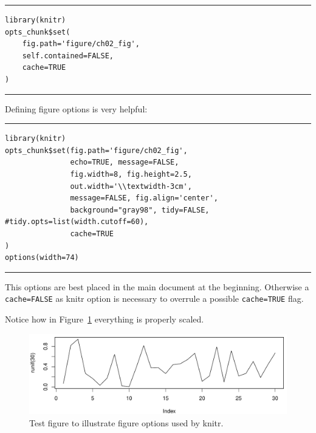 \bigskip

\hrule
\begin{knitrout}
\color{fgcolor}\begin{kframe}
\begin{verbatim}
library(knitr) 
opts_chunk$set( 
    fig.path='figure/ch02_fig',    
    self.contained=FALSE,
    cache=TRUE
) 
\end{verbatim}
\end{kframe}
\end{knitrout}
\hrule

\bigskip

Defining figure options is very helpful:

 
\bigskip


\hrule
\begin{knitrout}
\color{fgcolor}\begin{kframe}
\begin{verbatim}
library(knitr)
opts_chunk$set(fig.path='figure/ch02_fig',
               echo=TRUE, message=FALSE,
               fig.width=8, fig.height=2.5,  
               out.width='\\textwidth-3cm',
               message=FALSE, fig.align='center',
               background="gray98", tidy=FALSE, #tidy.opts=list(width.cutoff=60),
               cache=TRUE
) 
options(width=74)
\end{verbatim}
\end{kframe}
\end{knitrout}
\hrule

\bigskip 

This options are best placed in the main document at the beginning. Otherwise a \verb+cache=FALSE+ as knitr option is necessary to overrule a possible  \verb+cache=TRUE+ flag. 

\bigskip 

Notice how in Figure~\ref{f02:1} everything is properly scaled.   

\begin{figure}
\begin{knitrout}
\color{fgcolor}

{\centering \includegraphics[width=\textwidth-3cm]{figure/ch02_figunnamed-chunk-3-1} 

}


\end{knitrout}
  \caption{Test figure to illustrate figure options used by knitr.}
  \label{f02:1}
\end{figure}


